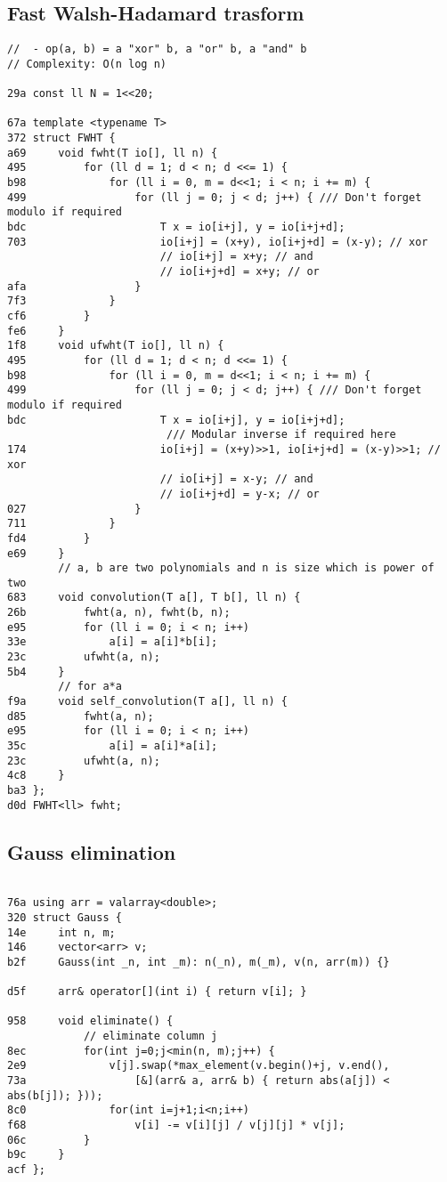 \documentclass[11pt, a4paper, twoside]{article}
\begin{document}
\subsection{Fast Walsh-Hadamard trasform}
\begin{lstlisting}
// 	- op(a, b) = a "xor" b, a "or" b, a "and" b
// Complexity: O(n log n)

29a const ll N = 1<<20;

67a template <typename T>
372 struct FWHT {
a69 	void fwht(T io[], ll n) {
495 		for (ll d = 1; d < n; d <<= 1) {
b98 			for (ll i = 0, m = d<<1; i < n; i += m) {
499 				for (ll j = 0; j < d; j++) { /// Don't forget modulo if required
bdc 					T x = io[i+j], y = io[i+j+d];
703 					io[i+j] = (x+y), io[i+j+d] = (x-y);	// xor
    					// io[i+j] = x+y; // and
    					// io[i+j+d] = x+y; // or
afa 				}
7f3 			}
cf6 		}
fe6 	}
1f8 	void ufwht(T io[], ll n) {
495 		for (ll d = 1; d < n; d <<= 1) {
b98 			for (ll i = 0, m = d<<1; i < n; i += m) {
499 				for (ll j = 0; j < d; j++) { /// Don't forget modulo if required
bdc 					T x = io[i+j], y = io[i+j+d];
    					 /// Modular inverse if required here
174 					io[i+j] = (x+y)>>1, io[i+j+d] = (x-y)>>1; // xor
    					// io[i+j] = x-y; // and
    					// io[i+j+d] = y-x; // or
027 				}
711 			}
fd4 		}
e69 	}
    	// a, b are two polynomials and n is size which is power of two
683 	void convolution(T a[], T b[], ll n) {
26b 		fwht(a, n), fwht(b, n);
e95 		for (ll i = 0; i < n; i++)
33e 			a[i] = a[i]*b[i];
23c 		ufwht(a, n);
5b4 	}
    	// for a*a	
f9a 	void self_convolution(T a[], ll n) {
d85 		fwht(a, n);
e95 		for (ll i = 0; i < n; i++)
35c 			a[i] = a[i]*a[i];
23c 		ufwht(a, n);
4c8 	}
ba3 };
d0d FWHT<ll> fwht;
\end{lstlisting}

\subsection{Gauss elimination}
\begin{lstlisting}

76a using arr = valarray<double>;
320 struct Gauss {
14e 	int n, m;
146 	vector<arr> v;
b2f 	Gauss(int _n, int _m): n(_n), m(_m), v(n, arr(m)) {}
    
d5f 	arr& operator[](int i) { return v[i]; }
    
958 	void eliminate() {
    		// eliminate column j
8ec 		for(int j=0;j<min(n, m);j++) {
2e9 			v[j].swap(*max_element(v.begin()+j, v.end(), 
73a 				[&](arr& a, arr& b) { return abs(a[j]) < abs(b[j]); }));
8c0 			for(int i=j+1;i<n;i++)
f68 				v[i] -= v[i][j] / v[j][j] * v[j];
06c 		}
b9c 	}
acf };
\end{lstlisting}
\end{document}
